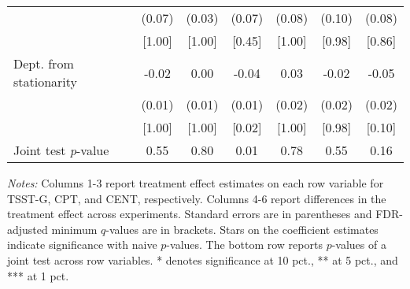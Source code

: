 \begin{table}[htbp]
{\begin{threeparttable}
\begin{tabular}{l*{6}{c}}
          &   (0.07)&   (0.03)&   (0.07)&   (0.08)&   (0.10)&   (0.08)\\
          &   [1.00]&   [1.00]&   [0.45]&   [1.00]&   [0.98]&   [0.86]\\
Dept. from stationarity&-0.02\sym{*}&     0.00&-0.04\sym{***}&     0.03&    -0.02&-0.05\sym{**}\\
          &   (0.01)&   (0.01)&   (0.01)&   (0.02)&   (0.02)&   (0.02)\\
          &   [1.00]&   [1.00]&[0.02\sym{**}]&   [1.00]&   [0.98]&   [0.10]\\
\midrule Joint test \emph{p}-value&     0.55&     0.80&0.01\sym{***}&     0.78&     0.55&     0.16\\
\bottomrule \end{tabular} \begin{tablenotes}[flushleft] \footnotesize \item \emph{Notes:} Columns 1-3 report treatment effect estimates on each row variable for TSST-G, CPT, and CENT, respectively. Columns 4-6 report differences in the treatment effect across experiments. Standard errors are in parentheses and FDR-adjusted minimum \(q\)-values are in brackets. Stars on the coefficient estimates indicate significance with naive \(p\)-values. The bottom row reports \(p\)-values of a joint test across row variables. * denotes significance at 10 pct., ** at 5 pct., and *** at 1 pct. \end{tablenotes} \end{threeparttable} } \end{table}
